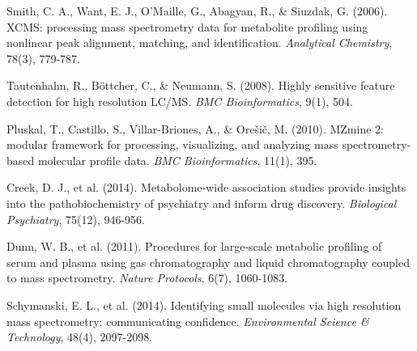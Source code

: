 \documentclass[12pt,a4paper]{article}
\begin{document}
\begin{thebibliography}{99}
Smith, C. A., Want, E. J., O'Maille, G., Abagyan, R., \& Siuzdak, G. (2006). XCMS: processing mass spectrometry data for metabolite profiling using nonlinear peak alignment, matching, and identification. \textit{Analytical Chemistry}, 78(3), 779-787.

Tautenhahn, R., Böttcher, C., \& Neumann, S. (2008). Highly sensitive feature detection for high resolution LC/MS. \textit{BMC Bioinformatics}, 9(1), 504.

Pluskal, T., Castillo, S., Villar-Briones, A., \& Orešič, M. (2010). MZmine 2: modular framework for processing, visualizing, and analyzing mass spectrometry-based molecular profile data. \textit{BMC Bioinformatics}, 11(1), 395.

Creek, D. J., et al. (2014). Metabolome-wide association studies provide insights into the pathobiochemistry of psychiatry and inform drug discovery. \textit{Biological Psychiatry}, 75(12), 946-956.

Dunn, W. B., et al. (2011). Procedures for large-scale metabolic profiling of serum and plasma using gas chromatography and liquid chromatography coupled to mass spectrometry. \textit{Nature Protocols}, 6(7), 1060-1083.

Schymanski, E. L., et al. (2014). Identifying small molecules via high resolution mass spectrometry: communicating confidence. \textit{Environmental Science \& Technology}, 48(4), 2097-2098.

\end{thebibliography}
\end{document}
